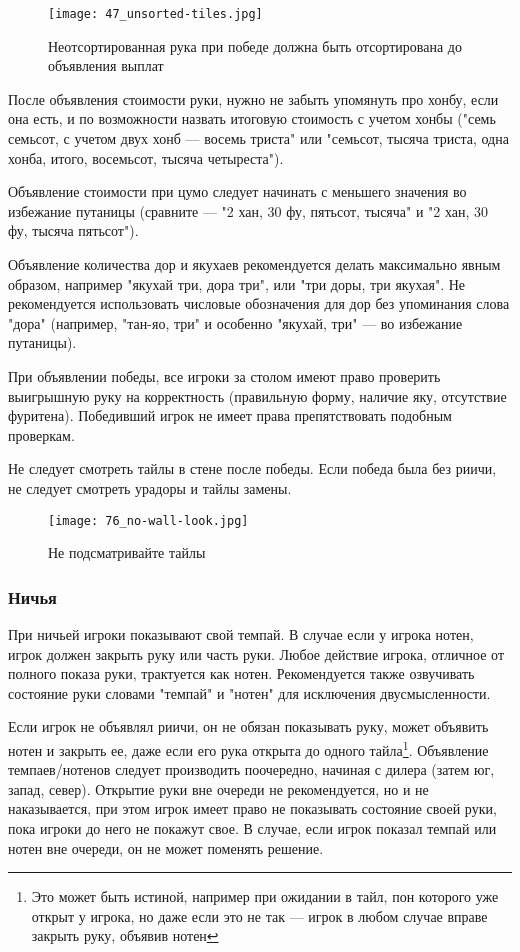 \begin{figure}[H]
	\centering
	\texttt{[image: 47\_unsorted-tiles.jpg]}
	\caption{\centering Неотсортированная рука при победе \linebreak должна быть отсортирована до объявления выплат}
\end{figure}

После объявления стоимости руки, нужно не забыть упомянуть про хонбу, если она есть, и по возможности назвать итоговую стоимость с учетом хонбы ("семь семьсот, с учетом двух хонб --- восемь триста" или "семьсот, тысяча триста, одна хонба, итого, восемьсот, тысяча четыреста").

Объявление стоимости при цумо следует начинать с меньшего значения во избежание путаницы (сравните --- "2 хан, 30 фу, пятьсот, тысяча" и "2 хан, 30 фу, тысяча пятьсот").

Объявление количества дор и якухаев рекомендуется делать максимально явным образом, например "якухай три, дора три", или "три доры, три якухая". Не рекомендуется использовать числовые обозначения для дор без упоминания слова "дора" (например, "тан-яо, три" и особенно "якухай, три" --- во избежание путаницы).

При объявлении победы, все игроки за столом имеют право проверить выигрышную руку на корректность (правильную форму, наличие яку, отсутствие фуритена). Победивший игрок не имеет права препятствовать подобным проверкам.

Не следует смотреть тайлы в стене после победы. Если победа была без риичи, не следует смотреть урадоры и тайлы замены. 

\begin{figure}[H]
	\centering
	\texttt{[image: 76\_no-wall-look.jpg]}
	\caption{Не подсматривайте тайлы}
\end{figure}

\newpage

\subsubsection{Ничья}

При ничьей игроки показывают свой темпай. В случае если у игрока нотен, игрок должен закрыть руку или часть руки. Любое действие игрока, отличное от полного показа руки, трактуется как нотен. Рекомендуется также озвучивать состояние руки словами "темпай" и "нотен" для исключения двусмысленности.

Если игрок не объявлял риичи, он не обязан показывать руку, может объявить нотен и закрыть ее, даже если его рука открыта до одного тайла\footnote{Это может быть истиной, например при ожидании в тайл, пон которого уже открыт у игрока, но даже если это не так --- игрок в любом случае вправе закрыть руку, объявив нотен}. Объявление темпаев/нотенов следует производить поочередно, начиная с дилера (затем юг, запад, север). Открытие руки вне очереди не рекомендуется, но и не наказывается, при этом игрок имеет право не показывать состояние своей руки, пока игроки до него не покажут свое. В случае, если игрок показал темпай или нотен вне очереди, он не может поменять решение.

